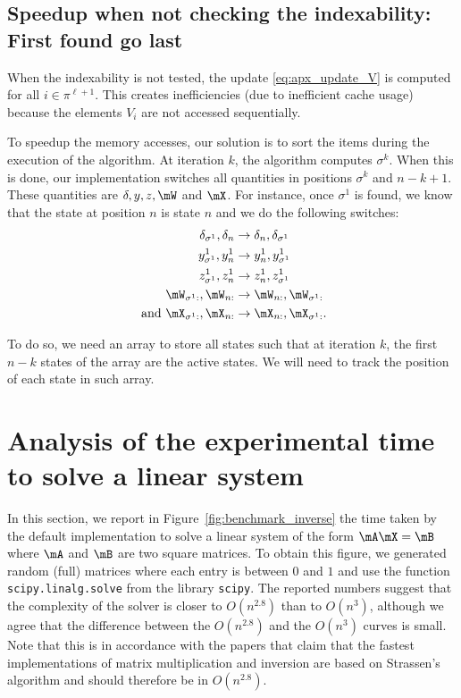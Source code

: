 \subsection{Speedup when not checking the indexability: First found go last} 

When the indexability is not tested, the update \eqref{eq:apx_update_V} is computed for all $i\in\pi^{\ell+1}$. This creates inefficiencies (due to  inefficient cache usage) because the elements $V_{i}$ are not accessed sequentially.

To speedup the memory accesses, our solution is to sort the items during the execution of the algorithm. At iteration $k$, the algorithm computes $\sigma^{k}$. When this is done, our implementation switches all quantities in positions $\sigma^{k}$ and $n-k+1$. These quantities are $\delta, y, z, \mW$ and $\mX$. For instance, once $\sigma^1$ is found, we know that the state at position $n$ is state $n$ and we do the following switches:
\begin{align*}
    \delta_{\sigma^1}, \delta_{n} &\rightarrow \delta_{n}, \delta_{\sigma^1} \\
    y^1_{\sigma^1}, y^1_{n} &\rightarrow y^1_{n}, y^1_{\sigma^1} \\
    z^1_{\sigma^1}, z^1_{n} &\rightarrow z^1_{n}, z^1_{\sigma^1} \\
    \mW_{\sigma^1 :}, \mW_{n :} &\rightarrow \mW_{n:}, \mW_{\sigma^1:} \\
    \text{ and } \mX_{\sigma^1 :}, \mX_{n :} &\rightarrow \mX_{n :}, \mX_{\sigma^1 :}.
\end{align*}

To do so, we need an array to store all states such that at iteration $k$, the first $n-k$ states of the array are the active states. We will need to track the position of each state in such array.

\section{Analysis of the experimental time to solve a linear system}
\label{apx:inversion}

In this section, we report in Figure~\ref{fig:benchmark_inverse} the time taken by the default implementation to solve a linear system of the form $\mA\mX=\mB$ where $\mA$ and $\mB$ are two square matrices. To obtain this figure, we generated random (full) matrices where each entry is between $0$ and $1$ and use the function  \texttt{scipy.linalg.solve} from the library \texttt{scipy}. The reported numbers suggest that the complexity of the solver is closer to $O(n^{2.8})$ than to $O(n^3)$, although we agree that the difference between the $O(n^{2.8})$ and the $O(n^3)$ curves is small. Note that this is in accordance with the papers \cite{huang2016strassen,huang2018practical} that claim that the fastest implementations of matrix multiplication and inversion are based on Strassen's algorithm and should therefore be in $O(n^{2.8})$. 


